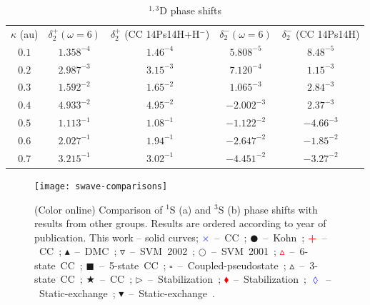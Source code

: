 \documentclass[preprint,showpacs,preprintnumbers,amsmath,amssymb,longbibliography,pra,aps]{revtex4-1}
\begin{document}
\begin{table}
\begin{center}
\begin{ruledtabular}
\begin{tabular}{c c c c c}
$\kappa$ (au) & $\delta_2^+ (\omega = 6)$ & $\delta_2^+$ (CC 14Ps14H+H$^-$) \cite{Walters2004} & $\delta_2^- (\omega = 6)$ & $\delta_2^-$ (CC 14Ps14H) \cite{Blackwood2002} \\
\colrule
$0.1$ & $1.358^{-4}$ & $1.46^{-4}$ & $5.808^{-5}$ & $8.48^{-5}$ \\
$0.2$ & $2.987^{-3}$ & $3.15^{-3}$ & $7.120^{-4}$ & $1.15^{-3}$ \\
$0.3$ & $1.592^{-2}$ & $1.65^{-2}$ & $1.065^{-3}$ & $2.84^{-3}$ \\
$0.4$ & $4.933^{-2}$ & $4.95^{-2}$ & $-2.002^{-3}$ & $2.37^{-3}$ \\
$0.5$ & $1.113^{-1}$ & $1.08^{-1}$ & $-1.122^{-2}$ & $-4.66^{-3}$ \\
$0.6$ & $2.027^{-1}$ & $1.94^{-1}$ & $-2.647^{-2}$ & $-1.85^{-2}$ \\
$0.7$ & $3.215^{-1}$ & $3.02^{-1}$ & $-4.451^{-2}$ & $-3.27^{-2}$ \\
\end{tabular}
\end{ruledtabular}
\caption{$^{1,3}$D phase shifts}
\label{tab:DWavePhase}
\end{center}
\end{table}



\begin{figure}[H]
	\centering
	\texttt{[image: swave-comparisons]}
	\caption{(Color online) Comparison of $^1$S (a) and $^3$S (b) phase shifts with results from other groups. Results are ordered according to year of publication. This work -- solid curves; \mbox{\textcolor{blue}{$\times$} -- CC \cite{Walters2004};} \mbox{$\CIRCLE$ -- Kohn \cite{VanReeth2003};} \mbox{\textcolor{red}{\textbf{+}} -- CC \cite{Blackwood2002};} \mbox{$\blacktriangle$ -- DMC \cite{Chiesa2002};} \mbox{$\triangledown$ -- SVM 2002 \cite{Ivanov2002};} \mbox{$\Circle$ -- SVM 2001 \cite{Ivanov2001};} \mbox{\textcolor{red}{$\vartriangle$} -- 6-state CC \cite{Sinha2000};} \mbox{$\blacksquare$ -- 5-state CC \cite{Adhikari1999};} \mbox{$\square$ -- Coupled-pseudostate \cite{Campbell1998};} \mbox{$\vartriangle$ -- 3-state CC \cite{Sinha1997};} \mbox{\textcolor[RGB]{0,127,0}{$\bigstar$} -- CC \cite{Ray1997};} \mbox{$\triangleright$ -- Stabilization \cite{Drachman1976};} \mbox{\textcolor{red}{$\blacklozenge$} -- Stabilization \cite{Drachman1975};} \mbox{\textcolor{blue}{$\lozenge$} -- Static-exchange \cite{Hara1975};} \mbox{$\blacktriangledown$ -- Static-exchange \cite{Fraser1961}.}}
	\label{fig:swave-comparisons}
\end{figure}
\end{document}
